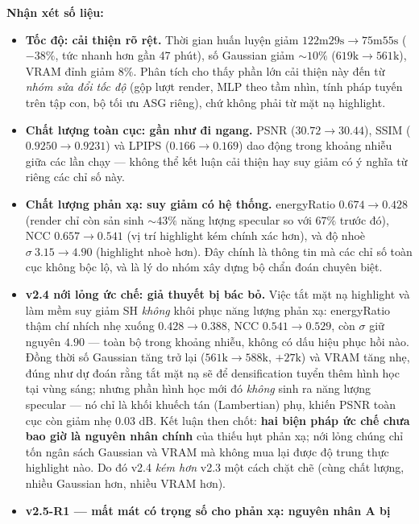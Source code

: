     \textbf{Nhận xét số liệu:}
    \begin{itemize}
        \item \textbf{Tốc độ: cải thiện rõ rệt.} Thời gian huấn luyện giảm
        $122\text{m}29\text{s} \to 75\text{m}55\text{s}$ ($-38\%$, tức nhanh hơn gần
        47 phút), số Gaussian giảm $\sim 10\%$ ($619\text{k}\to 561\text{k}$), VRAM
        đỉnh giảm $8\%$. Phân tích cho thấy phần lớn cải thiện này đến từ \textit{nhóm
        sửa đổi tốc độ} (gộp lượt render, MLP theo tầm nhìn, tính pháp tuyến trên
        tập con, bộ tối ưu ASG riêng), chứ không phải từ mặt nạ highlight.
        \item \textbf{Chất lượng toàn cục: gần như đi ngang.} PSNR ($30.72\to
        30.44$), SSIM ($0.9250\to 0.9231$) và LPIPS ($0.166\to 0.169$) dao động
        trong khoảng nhiễu giữa các lần chạy — không thể kết luận cải thiện hay suy
        giảm có ý nghĩa từ riêng các chỉ số này.
        \item \textbf{Chất lượng phản xạ: suy giảm có hệ thống.} energyRatio
        $0.674\to 0.428$ (render chỉ còn sản sinh $\sim 43\%$ năng lượng specular so
        với $67\%$ trước đó), NCC $0.657\to 0.541$ (vị trí highlight kém chính xác
        hơn), và độ nhoè $\sigma\ 3.15\to 4.90$ (highlight nhoè hơn). Đây chính là
        thông tin mà các chỉ số toàn cục không bộc lộ, và là lý do nhóm xây dựng bộ
        chẩn đoán chuyên biệt.
        \item \textbf{v2.4 nới lỏng ức chế: giả thuyết bị bác bỏ.} Việc tắt mặt nạ
        highlight và làm mềm suy giảm SH \textit{không} khôi phục năng lượng phản xạ:
        energyRatio thậm chí nhích nhẹ xuống $0.428\to 0.388$, NCC $0.541\to 0.529$,
        còn $\sigma$ giữ nguyên $4.90$ — toàn bộ trong khoảng nhiễu, không có dấu hiệu
        phục hồi nào. Đồng thời số Gaussian tăng trở lại ($561\text{k}\to 588\text{k}$,
        $+27\text{k}$) và VRAM tăng nhẹ, đúng như dự đoán rằng tắt mặt nạ sẽ để
        densification tuyển thêm hình học tại vùng sáng; nhưng phần hình học mới đó
        \textit{không} sinh ra năng lượng specular — nó chỉ là khối khuếch tán
        (Lambertian) phụ, khiến PSNR toàn cục còn giảm nhẹ $0.03$ dB. Kết luận then
        chốt: \textbf{hai biện pháp ức chế chưa bao giờ là nguyên nhân chính} của
        thiếu hụt phản xạ; nới lỏng chúng chỉ tốn ngân sách Gaussian và VRAM mà không
        mua lại được độ trung thực highlight nào. Do đó v2.4 \textit{kém hơn} v2.3 một
        cách chặt chẽ (cùng chất lượng, nhiều Gaussian hơn, nhiều VRAM hơn).
        \item \textbf{v2.5-R1 --- mất mát có trọng số cho phản xạ: nguyên nhân A bị
}
\end{itemize}
